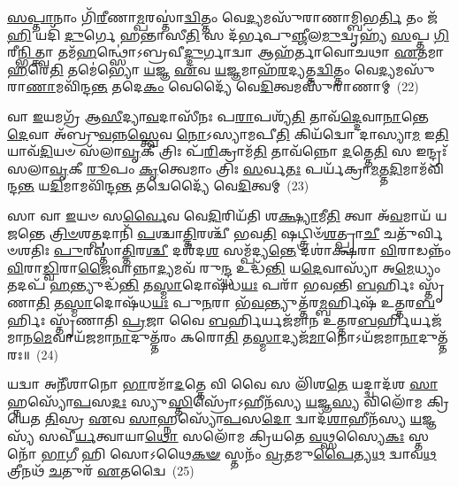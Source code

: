 \-\ul{𑌸}\-\-\ul{𑌪𑍍𑌤𑌾}\-𑌨𑌾𑌂 𑌗𑌿᳴\-\ul{𑌰𑍀}\-𑌣𑌾\-\ul{𑌮𑍍𑌪}\-𑌰𑌸𑍍𑌤𑌾॑\-\ul{𑌦𑍍𑌵𑌿}\-𑌤𑍍𑌤𑌂 𑌵𑍇\-\ul{𑌦𑍍𑌯}\-𑌮𑌸𑍁᳴𑌰𑌾𑌣𑌾𑌮𑍍𑌬𑌿𑌭\-\ul{𑌰𑍍𑌤𑌿} 𑌤𑌂 𑌜᳴\-\ul{𑌹𑌿} 𑌯𑌦𑌿᳴ \ul{𑌦𑍁}\-𑌰𑍍𑌗𑍇 𑌹𑌨𑍍𑌤𑌾𑌸𑍀\-\ul{𑌤𑌿} 𑌸 𑌦᳴𑌰𑍍𑌭𑌪𑍁\-\ul{𑌞𑍍𑌜𑍀}\-𑌲\-\ul{𑌮𑍁}\-𑌦𑍍𑌵𑍃𑌹𑍍𑌯᳴ \ul{𑌸}\-𑌪𑍍𑌤 \ul{𑌗𑌿}\-𑌰𑍀\-\ul{𑌨𑍍𑌭𑌿}\-𑌤𑍍𑌤𑍍𑌵𑌾 𑌤𑌮᳴\-\ul{𑌹}\-𑌨𑍍𑌥𑍍𑌸𑍋॑\-𑌽𑌬𑍍𑌰𑌵𑍀\-\ul{𑌦𑍍𑌦𑍁}\-𑌰𑍍𑌗𑌾𑌦𑍍𑌵𑌾 𑌆𑌹᳴𑌰𑍍𑌤𑌾𑌵𑍋𑌚𑌥𑌾 \ul{𑌏}\-𑌤𑌮𑌾 \ul{𑌹}\-𑌰𑍇\-\ul{𑌤𑌿} 𑌤𑌮𑍇॑𑌭𑍍𑌯𑍋 \ul{𑌯}\-𑌜𑍍𑌞 \ul{𑌏}\-𑌵 \ul{𑌯}\-𑌜𑍍𑌞𑌮𑌾𑌹᳴\-\ul{𑌰}\-𑌦𑍍𑌯𑌤𑍍𑌤\-\ul{𑌦𑍍𑌵𑌿}\-𑌤𑍍𑌤𑌂 𑌵𑍇\-\ul{𑌦𑍍𑌯}\-𑌮𑌸𑍁᳴𑌰𑌾\-\ul{𑌣𑌾}\-𑌮𑌵𑌿᳴𑌨𑍍𑌦\-\ul{𑌨𑍍𑌤} 𑌤𑌦𑍇\-\ul{𑌕𑌂} 𑌵𑍇𑌦𑍍𑌯𑍈᳴ 𑌵𑍇\-\ul{𑌦𑌿}\-𑌤𑍍𑌵𑌮𑌸𑍁᳴𑌰𑌾𑌣𑌾𑌮𑍍~(22)

𑌵𑌾 \ul{𑌇}\-𑌯𑌮𑌗𑍍𑌰᳴ 𑌆\-\ul{𑌸𑍀}\-𑌦𑍍𑌯𑌾\-\ul{𑌵}\-𑌦𑌾𑌸𑍀᳴𑌨𑌃 𑌪\-\ul{𑌰𑌾}\-𑌪𑌶𑍍𑌯᳴\-\ul{𑌤𑌿} 𑌤𑌾𑌵᳴\-\ul{𑌦𑍍𑌦𑍇}\-𑌵𑌾\-\ul{𑌨𑌾}\-𑌨𑍍𑌤𑍇 \ul{𑌦𑍇}\-𑌵𑌾 𑌅᳴𑌬𑍍𑌰𑍁\-\ul{𑌵}\-𑌨𑍍𑌨\-\ul{𑌸𑍍𑌤𑍍𑌵𑍇}\-𑌵 \ul{𑌨𑍋}\-\-𑌽𑌸𑍍𑌯𑌾𑌮𑌪𑍀\-\ul{𑌤𑌿} 𑌕𑌿𑌯᳴𑌦𑍍𑌵𑍋 𑌦𑌾𑌸𑍍𑌯𑌾\-\ul{𑌮} 𑌇\-\ul{𑌤𑌿} 𑌯𑌾𑌵᳴\-\ul{𑌦𑌿}\-𑌯𑍞 𑌸᳴𑌲𑌾\-\ul{𑌵𑍃}\-𑌕𑍀 𑌤𑍍𑌰𑌿𑌃 𑌪᳴\-\ul{𑌰𑌿}\-𑌕𑍍𑌰𑌾𑌮᳴\-\ul{𑌤𑌿} 𑌤𑌾𑌵᳴𑌨𑍍𑌨𑍋 \ul{𑌦}\-𑌤𑍍𑌤𑍇\-\ul{𑌤𑌿} 𑌸 𑌇𑌨𑍍𑌦𑍍𑌰𑌃᳴ 𑌸𑌲𑌾\-\ul{𑌵𑍃}\-𑌕𑍀 \ul{𑌰𑍂}\-𑌪𑌂 \ul{𑌕𑍃}\-𑌤𑍍𑌵𑍇𑌮𑌾𑌂 𑌤𑍍𑌰𑌿𑌃 \ul{𑌸}\-𑌰𑍍𑌵\-\ul{𑌤𑌃} 𑌪𑌰𑍍𑌯᳴𑌕𑍍𑌰𑌾\-\ul{𑌮}\-𑌤𑍍𑌤\-\ul{𑌦𑌿}\-𑌮𑌾𑌮᳴𑌵𑌿𑌨𑍍𑌦\-\ul{𑌨𑍍𑌤} 𑌯\-\ul{𑌦𑌿}\-𑌮𑌾𑌮𑌵𑌿᳴𑌨𑍍𑌦\-\ul{𑌨𑍍𑌤} 𑌤𑌦𑍍𑌵𑍇𑌦𑍍𑌯𑍈᳴ 𑌵𑍇\-\ul{𑌦𑌿}\-𑌤𑍍𑌵𑌮𑍍~(23)

𑌸𑌾 𑌵𑌾 \ul{𑌇}\-𑌯𑍞 𑌸\-\ul{𑌰𑍍𑌵𑍈}\-𑌵 𑌵𑍇\-\ul{𑌦𑌿}\-𑌰𑌿𑌯᳴𑌤𑌿 𑌶\-\ul{𑌕𑍍𑌷𑍍𑌯𑌾}\-𑌮𑍀\-\ul{𑌤𑌿} 𑌤𑍍𑌵𑌾 𑌅᳴\-\ul{𑌵}\-𑌮𑌾𑌯᳴ 𑌯𑌜𑌨𑍍𑌤𑍇 \ul{𑌤𑍍𑌰𑌿}\-\-\ul{𑍞}\-𑌶\-\ul{𑌤𑍍𑌪}\-𑌦𑌾𑌨𑌿᳴ \ul{𑌪}\-𑌶𑍍𑌚𑌾\-\ul{𑌤𑍍𑌤𑌿}\-𑌰𑌶𑍍𑌚𑍀᳴ 𑌭𑌵\-\ul{𑌤𑌿} 𑌷𑌟𑍍𑌤𑍍𑌰𑌿𑍞᳴\-\ul{𑌶}\-𑌤𑍍𑌪𑍍𑌰𑌾\-\ul{𑌚𑍀} 𑌚𑌤𑍁᳴𑌰𑍍𑌵𑌿𑍞𑌶𑌤𑌿𑌃 \ul{𑌪𑍁}\-𑌰𑌸𑍍𑌤𑌾॑\-\ul{𑌤𑍍𑌤𑌿}\-𑌰\-\ul{𑌶𑍍𑌚𑍀} 𑌦𑌶᳴𑌦\-\ul{𑌶} 𑌸𑌮𑍍𑌪᳴𑌦𑍍𑌯\-\ul{𑌨𑍍𑌤𑍇} 𑌦𑌶𑌾॑𑌕𑍍𑌷𑌰𑌾 \ul{𑌵𑌿}\-𑌰𑌾𑌡𑌨𑍍𑌨𑌂᳴ \ul{𑌵𑌿}\-𑌰𑌾\-\ul{𑌡𑍍𑌵𑌿}\-𑌰𑌾\-\ul{𑌜𑍈}\-𑌵𑌾𑌨𑍍𑌨𑌾\-\ul{𑌦𑍍𑌯}\-𑌮𑌵᳴ 𑌰𑍁\-\ul{𑌨𑍍𑌦𑍍𑌧} 𑌉𑌦𑍍𑌧᳴\-\ul{𑌨𑍍𑌤𑌿} 𑌯\-\ul{𑌦𑍇}\-𑌵𑌾𑌸𑍍𑌯𑌾᳴ 𑌅\-\ul{𑌮𑍇}\-𑌧𑍍𑌯𑌂 𑌤𑌦𑌪᳴ \ul{𑌹}\-𑌨𑍍𑌤𑍍𑌯𑍁𑌦𑍍𑌧᳴\-\ul{𑌨𑍍𑌤𑌿} 𑌤\-\ul{𑌸𑍍𑌮𑌾}\-𑌦𑍋𑌷᳴𑌧\-\ul{𑌯𑌃} 𑌪𑌰𑌾᳴ 𑌭𑌵𑌨𑍍𑌤𑌿 \ul{𑌬}\-𑌰𑍍\mbox{}𑌹𑌿𑌃 𑌸𑍍𑌤𑍃᳴𑌣𑌾\-\ul{𑌤𑌿} 𑌤\-\ul{𑌸𑍍𑌮𑌾}\-𑌦𑍋𑌷᳴𑌧\-\ul{𑌯𑌃} 𑌪𑍁\-\ul{𑌨}\-𑌰𑌾 𑌭᳴\-\ul{𑌵}\-𑌨𑍍𑌤𑍍𑌯𑍁𑌤𑍍𑌤᳴𑌰\-\ul{𑌮𑍍𑌬}\-𑌰𑍍\mbox{}𑌹𑌿𑌷᳴ 𑌉𑌤𑍍𑌤𑌰\-\ul{𑌬}\-𑌰𑍍\mbox{}𑌹𑌿𑌃 𑌸𑍍𑌤𑍃᳴𑌣𑌾𑌤𑌿 \ul{𑌪𑍍𑌰}\-𑌜𑌾 𑌵𑍈 \ul{𑌬}\-𑌰𑍍\mbox{}𑌹𑌿𑌰𑍍𑌯𑌜᳴𑌮𑌾𑌨 𑌉𑌤𑍍𑌤𑌰\-\ul{𑌬}\-𑌰𑍍\mbox{}𑌹𑌿𑌰𑍍𑌯𑌜᳴𑌮𑌾𑌨\-\ul{𑌮𑍇}\-𑌵𑌾𑌯᳴𑌜𑌮𑌾\-\ul{𑌨𑌾}\-𑌦𑍁𑌤𑍍𑌤᳴𑌰𑌂 𑌕𑌰𑍋\-\ul{𑌤𑌿} 𑌤\-\ul{𑌸𑍍𑌮𑌾}\-𑌦𑍍𑌯𑌜᳴\-\ul{𑌮𑌾}\-𑌨𑍋\-𑌽𑌯᳴𑌜𑌮𑌾\-\ul{𑌨𑌾}\-𑌦𑍁𑌤𑍍𑌤᳴𑌰𑌃॥~(24)

{}%

𑌯𑌦𑍍𑌵𑌾 𑌅𑌨𑍀᳴𑌶𑌾𑌨𑍋 \ul{𑌭𑌾}\-𑌰𑌮𑌾᳴\-\ul{𑌦}\-𑌤𑍍𑌤𑍇 𑌵𑌿 𑌵𑍈 𑌸 𑌲𑌿᳴𑌶\-\ul{𑌤𑍇} 𑌯𑌦𑍍𑌦𑍍𑌵𑌾𑌦᳴𑌶 \ul{𑌸𑌾}\-𑌹𑍍𑌨𑌸𑍍𑌯𑍋᳴\-\ul{𑌪}\-𑌸\-\ul{𑌦𑌃} 𑌸𑍍𑌯𑍁\-\ul{𑌸𑍍𑌤𑌿}\-𑌸𑍍𑌰𑍋᳴\-𑌽𑌹𑍀𑌨᳴𑌸𑍍𑌯 \ul{𑌯}\-𑌜𑍍𑌞\-\ul{𑌸𑍍𑌯} 𑌵𑌿𑌲𑍋᳴𑌮 𑌕𑍍𑌰𑌿𑌯𑍇𑌤 \ul{𑌤𑌿}\-𑌸𑍍𑌰 \ul{𑌏}\-𑌵 \ul{𑌸𑌾}\-𑌹𑍍𑌨𑌸𑍍𑌯𑍋᳴\-\ul{𑌪}\-𑌸\-\ul{𑌦𑍋} 𑌦𑍍𑌵𑌾𑌦᳴\-\ul{𑌶𑌾}\-𑌹𑍀𑌨᳴𑌸𑍍𑌯 \ul{𑌯}\-𑌜𑍍𑌞𑌸𑍍𑌯᳴ 𑌸𑌵𑍀\-\ul{𑌰𑍍𑌯}\-𑌤𑍍𑌵𑌾𑌯𑌾\-\ul{𑌥𑍋} 𑌸𑌲𑍋᳴𑌮 𑌕𑍍𑌰𑌿𑌯𑌤𑍇 \ul{𑌵}\-𑌥𑍍𑌸𑌸𑍍𑌯𑍈\-\ul{𑌕𑌃} 𑌸𑍍𑌤𑌨𑍋᳴ \ul{𑌭𑌾}\-𑌗𑍀 𑌹𑌿 𑌸𑍋\-𑌽𑌥𑍈\-\ul{𑌕}\-\-\ul{𑍟} 𑌸𑍍𑌤𑌨𑌂᳴ \ul{𑌵𑍍𑌰}\-𑌤𑌮𑍁\-\ul{𑌪𑍈}\-𑌤𑍍𑌯\-\ul{𑌥} 𑌦𑍍𑌵𑌾𑌵\-\ul{𑌥} 𑌤𑍍𑌰𑍀𑌨𑌥᳴ \ul{𑌚}\-𑌤𑍁𑌰᳴ \ul{𑌏}\-𑌤𑌦𑍍𑌵𑍈~(25)

